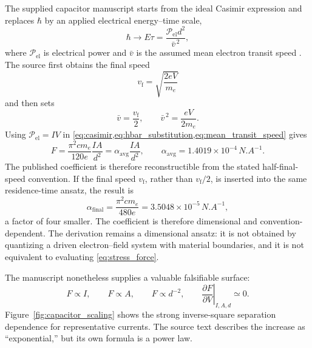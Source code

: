 \documentclass[11pt]{article}
\begin{document}
The supplied capacitor manuscript starts from the ideal Casimir expression and replaces \(\hbar\) by an applied electrical energy--time scale,
\begin{equation}
    \hbar
    \longrightarrow
    E\tau
    =\frac{\mathcal P_{\mathrm{el}}d^{2}}{\bar v^{\,2}},
    \label{eq:hbar_substitution}
\end{equation}
where \(\mathcal P_{\mathrm{el}}\) is electrical power and \(\bar v\) is the assumed mean electron transit speed \cite{McCulloch2021Capacitors}. The source first obtains the final speed
\begin{equation}
    v_{\mathrm f}=\sqrt{\frac{2eV}{m_e}}
\end{equation}
and then sets
\begin{equation}
    \bar v=\frac{v_{\mathrm f}}{2},
    \qquad
    \bar v^{\,2}=\frac{eV}{2m_e}.
    \label{eq:mean_transit_speed}
\end{equation}
Using \(\mathcal P_{\mathrm{el}}=IV\) in \cref{eq:casimir,eq:hbar_substitution,eq:mean_transit_speed} gives
\begin{equation}
    F
    =\frac{\pi^{2}cm_e}{120e}\frac{IA}{d^{2}}
    =\alpha_{\mathrm{avg}}\frac{IA}{d^{2}},
    \qquad
    \alpha_{\mathrm{avg}}
    =1.4019\times10^{-4}\,\si{N.A^{-1}}.
    \label{eq:alpha_average}
\end{equation}
The published coefficient is therefore reconstructible from the stated half-final-speed convention. If the final speed \(v_{\mathrm f}\), rather than \(v_{\mathrm f}/2\), is inserted into the same residence-time ansatz, the result is
\begin{equation}
    \alpha_{\mathrm{final}}
    =\frac{\pi^{2}cm_e}{480e}
    =3.5048\times10^{-5}\,\si{N.A^{-1}},
    \label{eq:alpha_final}
\end{equation}
a factor of four smaller. The coefficient is therefore dimensional and convention-dependent. The derivation remains a dimensional ansatz: it is not obtained by quantizing a driven electron--field system with material boundaries, and it is not equivalent to evaluating \cref{eq:stress_force}.

The manuscript nonetheless supplies a valuable falsifiable surface:
\begin{equation}
    F\propto I,
    \qquad
    F\propto A,
    \qquad
    F\propto d^{-2},
    \qquad
    \left.\frac{\partial F}{\partial V}\right|_{I,A,d}\simeq0.
    \label{eq:capacitor_scaling}
\end{equation}
Figure~\ref{fig:capacitor_scaling} shows the strong inverse-square separation dependence for representative currents. The source text describes the increase as ``exponential,'' but its own formula is a power law.
\end{document}
